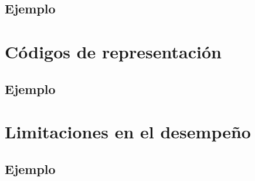 \documentclass{beamer}
\begin{document}
\subsection{Ejemplo}

\section{Códigos de representación}
\subsection{Ejemplo}
\section{Limitaciones en el desempeño}
\subsection{Ejemplo}
\end{document}
